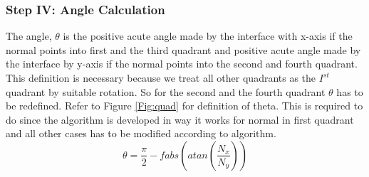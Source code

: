 \subsubsection{Step IV: Angle Calculation}
 The angle, $\theta$ is the positive acute angle made by the interface with x-axis if the normal points into first and the third quadrant and positive acute angle made by 
 the interface by y-axis if the normal points into the second and fourth quadrant. This definition is necessary because we treat all other quadrants as the $I^{st}$ quadrant
 by suitable rotation. So for the second and the fourth quadrant $\theta$ has to be redefined. Refer to Figure \ref{Fig:quad} for definition of theta. This is 
 required to do since the algorithm is developed in way it works for normal in first quadrant and all other cases has to be modified according to algorithm.
% 
%  
% 
% 
\begin{equation}
 \theta=\frac{\pi}{2}-fabs\left(atan\left(\frac{N_x}{N_y}\right)\right)
 \end{equation}
 
